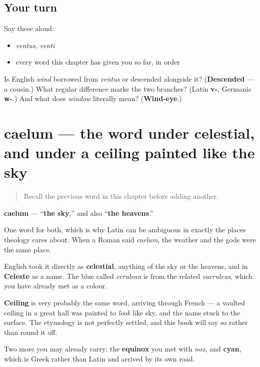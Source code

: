 \subsection*{Your turn}
Say these aloud:

\begin{itemize}
\raggedright
  \item \emph{ventus, ventī}
  \item every word this chapter has given you so far, in order
\end{itemize}

\begin{tcolorbox}[breakable,colback=teal!4,colframe=teal!35!black,title={Before you move on}]
Is English \emph{wind} borrowed from \emph{ventus} or descended alongside it? (\textbf{Descended} — a cousin.) What regular difference marks the two branches? (Latin \textbf{v-}, Germanic \textbf{w-}.) And what does \emph{window} literally mean? (\textbf{Wind-eye}.)
\end{tcolorbox}
\section[caelum, caelī]{caelum — the word under celestial, and under a ceiling painted like the sky}

\label{lesson:LA-C45-caelum}



\begin{quote}
Recall the previous word in this chapter before adding another.
\end{quote}

\begin{cousinweb}
\textbf{caelum} — \textquotedblleft{}\textbf{the sky},\textquotedblright{} and also \textquotedblleft{}\textbf{the heavens}.\textquotedblright{}

One word for both, which is why Latin can be ambiguous in exactly the places theology cares about. When a Roman said \emph{caelum}, the weather and the gods were the same place.

English took it directly as \textbf{celestial}, anything of the sky or the heavens, and in \textbf{Celeste} as a name. The blue called \emph{cerulean} is from the related \emph{caeruleus}, which you have already met as a colour.

\textbf{Ceiling} is very probably the same word, arriving through French — a vaulted ceiling in a great hall was painted to \emph{look} like sky, and the name stuck to the surface. The etymology is not perfectly settled, and this book will say so rather than round it off.

Two more you may already carry: the \textbf{equinox} you met with \emph{nox}, and \textbf{cyan}, which is Greek rather than Latin and arrived by its own road.
\end{cousinweb}

